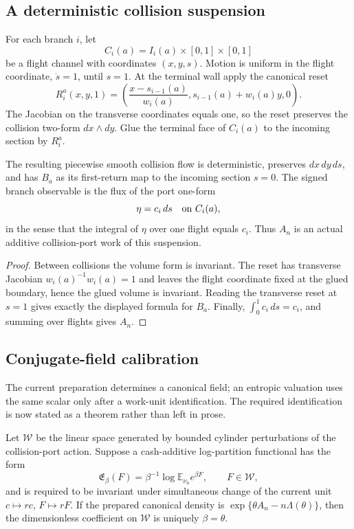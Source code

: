 \subsection{A deterministic collision suspension}

For each branch \(i\), let
\[
 C_i(a)=I_i(a)\times[0,1]\times[0,1]
\]
be a flight channel with coordinates \((x,y,s)\).  Motion is uniform in the
flight coordinate, \(\dot s=1\), until \(s=1\).  At the terminal wall apply
the canonical reset
\[
 R_i^a(x,y,1)=
 \left(
  \frac{x-s_{i-1}(a)}{w_i(a)},
  s_{i-1}(a)+w_i(a)y,
 0
 \right).
\]
The Jacobian on the transverse coordinates equals one, so the reset preserves
the collision two-form \(dx\wedge dy\).  Glue the terminal face of \(C_i(a)\)
to the incoming section by \(R_i^a\).

\begin{theorem}
\label{thm:rr2-a1-suspension}
The resulting piecewise smooth collision flow is deterministic, preserves
\(dx\,dy\,ds\), and has \(B_a\) as its first-return map to the incoming
section \(s=0\).  The signed branch observable is the flux of the port
one-form
\[
 \eta=c_i\,ds\quad\hbox{on }C_i(a),
\]
in the sense that the integral of \(\eta\) over one flight equals \(c_i\).
Thus \(A_n\) is an actual additive collision-port work of this suspension.
\end{theorem}

\begin{proof}
Between collisions the volume form is invariant.  The reset has transverse
Jacobian
\(
 w_i(a)^{-1}w_i(a)=1
\)
and leaves the flight coordinate fixed at the glued boundary, hence the
glued volume is invariant.  Reading the transverse reset at \(s=1\) gives
exactly the displayed formula for \(B_a\).  Finally,
\(\int_0^1 c_i\,ds=c_i\), and summing over flights gives \(A_n\).
\end{proof}

\subsection{Conjugate-field calibration}

The current preparation determines a canonical field; an entropic valuation
uses the same scalar only after a work-unit identification.  The required
identification is now stated as a theorem rather than left in prose.

\begin{theorem}
\label{thm:rr2-a1-calibration}
Let \(\mathcal W\) be the linear space generated by bounded cylinder
perturbations of the collision-port action.  Suppose a cash-additive
log-partition functional has the form
\[
 \mathfrak E_\beta(F)=\beta^{-1}
 \log\mathbb E_{\nu_a}e^{\beta F},\qquad F\in\mathcal W,
\]
and is required to be invariant under simultaneous change of the current
unit \(c\mapsto rc\), \(F\mapsto rF\).  If the prepared canonical density is
\(\exp\{\theta A_n-n\Lambda(\theta)\}\), then the dimensionless coefficient
on \(\mathcal W\) is uniquely \(\beta=\theta\).
\end{theorem}

